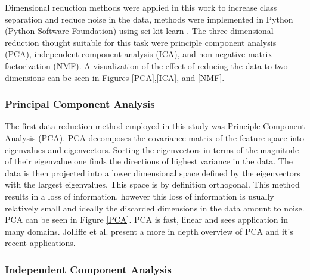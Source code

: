 \documentclass[a4paper,11pt]{article}
\begin{document}
Dimensional reduction methods were applied in this work to increase class separation and reduce noise in the data, methods were implemented in Python (Python Software Foundation) using sci-kit learn \cite{Pedregosa2011Scikit-learn:Python}. The three dimensional reduction thought suitable for this task were principle component analysis (PCA), independent component analysis (ICA), and non-negative matrix factorization (NMF). A visualization of the effect of reducing the data to two dimensions can be seen in Figures \ref{PCA},\ref{ICA}, and \ref{NMF}.

\subsubsection{Principal Component Analysis}

The first data reduction method employed in this study was Principle Component Analysis (PCA). PCA decomposes the covariance matrix of the feature space into eigenvalues and eigenvectors. Sorting the eigenvectors in terms of the magnitude of their eigenvalue one finds the directions of highest variance in the data. The data is then projected into a lower dimensional space defined by the eigenvectors with the largest eigenvalues. This space is by definition orthogonal. This method results in a loss of information, however this loss of information is usually relatively small and ideally the discarded dimensions in the data amount to noise. PCA can be seen in Figure \ref{PCA}. PCA is fast, linear and sees application in many domains. Jolliffe et al. \cite{Jolliffe2016PrincipalDevelopments.} present a more in depth overview of PCA and it's recent applications.

  
  
  

\subsubsection{Independent Component Analysis}
\end{document}
